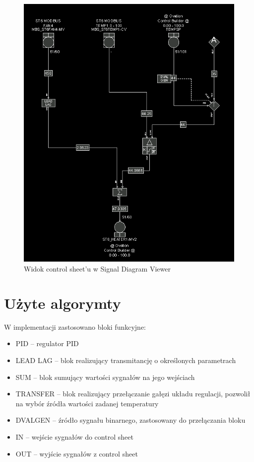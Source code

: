 \documentclass{mwrep}
\begin{document}
\begin{figure}[H]
\centering
\includegraphics[scale=0.4]{materialy/regulator_cutout.png}
\caption{Widok control sheet'u w Signal Diagram Viewer}
\end{figure}

\section{Użyte algorymty}
\label{AlgorytmyOVATION}

W implementacji zastosowano bloki funkcyjne:
\begin{itemize}
  \item PID – regulator PID
  \item LEAD LAG – blok realizujący transmitancję o określonych parametrach
  \item SUM – blok sumujący wartości sygnałów na jego wejściach
  \item TRANSFER – blok realizujący przełączanie gałęzi układu regulacji, pozwolił na wybór źródła wartości zadanej temperatury
  \item DVALGEN – źródło sygnału binarnego, zastosowany do przełączania bloku
  \item IN – wejście sygnałów do control sheet
  \item OUT – wyjście sygnałów z control sheet
\end{itemize}
 
\end{document}
